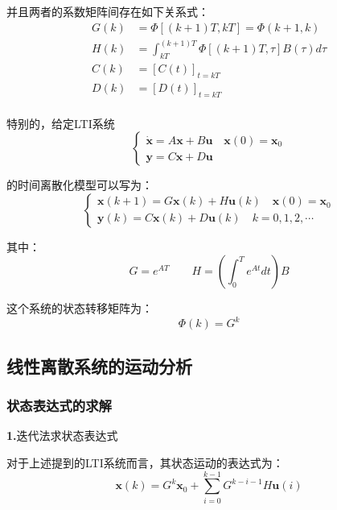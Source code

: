 并且两者的系数矩阵间存在如下关系式：
\begin{equation*}
    \begin{split}
        G(k) &= \Phi[(k+1)T,kT] = \Phi(k+1,k) \\
        H(k) &= \int_{kT}^{(k+1)T} \Phi[(k+1)T,\tau]B(\tau) d\tau \\
        C(k) &= [C(t)]_{t=kT} \\
        D(k) &= [D(t)]_{t=kT} \\
    \end{split}
\end{equation*}

特别的，给定LTI系统
\begin{equation*}
    \begin{cases}
        \dot{\bm{x}} = A \bm{x} + B \bm{u} \quad \bm{x}(0) = \bm{x}_0 \\
        \bm{y} = C \bm{x} + D \bm{u}
    \end{cases}
\end{equation*}

的时间离散化模型可以写为：
\begin{equation*}
    \begin{cases}
        \bm{x}(k+1) = G \bm{x}(k) + H \bm{u}(k) \quad  \bm{x}(0) = \bm{x}_0 \\
        \bm{y}(k) = C \bm{x}(k) + D \bm{u}(k) \quad k = 0,1,2,\cdots
    \end{cases}
\end{equation*}

其中：
\begin{equation*}
    G = e^{AT} \qquad H = (\int_0^T e^{At} dt) B
\end{equation*}

这个系统的状态转移矩阵为：
\begin{equation*}
    \Phi(k) = G^k
\end{equation*}

\subsection{线性离散系统的运动分析}

\subsubsection{状态表达式的求解}

\noindent \textbf{1.}迭代法求状态表达式

对于上述提到的LTI系统而言，其状态运动的表达式为：
\begin{equation*}
    \bm{x}(k) = G^k \bm{x}_0 + \sum_{i=0}^{k-1} G^{k-i-1} H \bm{u}(i)
\end{equation*}


